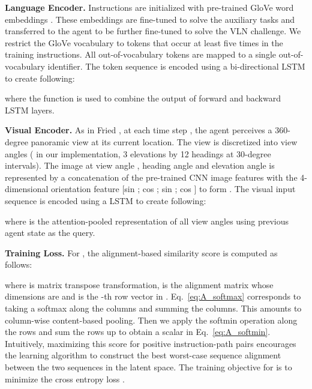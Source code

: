 \documentclass[10pt,twocolumn,letterpaper]{article}
\begin{document}
\textbf{Language Encoder.} 
Instructions  are initialized with pre-trained GloVe word embeddings \cite{Pennington:2014:GloVe}. These embeddings are fine-tuned to solve the auxiliary tasks and transferred to the agent to be further fine-tuned to solve the VLN challenge. We restrict the GloVe vocabulary to tokens that occur at least five times in the training instructions. All out-of-vocabulary tokens are mapped to a single out-of-vocabulary identifier. The token sequence is encoded using a bi-directional LSTM \cite{Schuster1997BidirectionalRN} to create  following:

\begin{small}

\end{small}

\noindent
where the  function is used to combine the output of forward and backward LSTM layers.

\textbf{Visual Encoder.}
As in Fried \etal \cite{Fried:2018:Speaker}, at each time step , the agent perceives a 360-degree panoramic view at its current location. The view is discretized into  view angles ( in our implementation, 3 elevations by 12 headings at 30-degree intervals).
The image at view angle , heading angle  and elevation angle  is represented by a concatenation of the pre-trained CNN image features with the 4-dimensional orientation feature [sin ; cos ; sin ; cos ] to form .
The visual input sequence  is encoded using a LSTM to create  following:


\begin{small}

\end{small}

\noindent
where  is the attention-pooled representation of all view angles using previous agent state  as the query.

\textbf{Training Loss.}
For {\taskcma}, the alignment-based similarity score is computed as follows:

\begin{small}

\end{small}

\noindent
where  is matrix transpose transformation,  is the alignment matrix whose dimensions are  and  is the -th row vector in . Eq.~\ref{eq:A_softmax} corresponds to taking a softmax along the columns and summing the columns. This amounts to column-wise content-based pooling. Then we apply the softmin operation along the rows and sum the rows up to obtain a scalar in Eq.~\ref{eq:A_softmin}. Intuitively, maximizing this score for positive instruction-path pairs encourages the learning algorithm to construct the best worst-case sequence alignment between the two sequences in the latent space. The training objective for {\taskcma} is to minimize the cross entropy loss .
\end{document}
